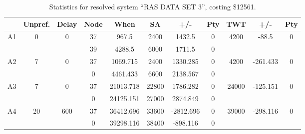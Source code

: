 \begin{sidewaystable}
\footnotesize
\caption{Statistics for resolved system ``RAS DATA SET 3'', costing \$12561.}
\centering
\begin{tabular}{c||c|c||c|c|c|c|c||c|c|c}
  \hline \hline
  &
  Unpref. & 
  Delay &
  Node &
  When &
  SA &
  +/- &
  Pty &
  TWT &
  +/- &
  Pty \\
      \hline
      \multirow{2}{*}{A1} &
      \multirow{2}{*}{0} &
      \multirow{2}{*}{0} &
      37 &
      967.5 &
      2400 &
        1432.5 &
        0 &
      \multirow{2}{*}{4200} &
        \multirow{2}{*}{-88.5} &
        \multirow{2}{*}{0}
      \\
      \cline{4-8}
       &
       &
       &
      39 &
      4288.5 &
      6000 &
        1711.5 &
        0 &
      
         &
        
      \\
      \hline
      \multirow{2}{*}{A2} &
      \multirow{2}{*}{7} &
      \multirow{2}{*}{0} &
      37 &
      1069.715 &
      2400 &
        1330.285 &
        0 &
      \multirow{2}{*}{4200} &
        \multirow{2}{*}{-261.433} &
        \multirow{2}{*}{0}
      \\
      \cline{4-8}
       &
       &
       &
      0 &
      4461.433 &
      6600 &
        2138.567 &
        0 &
      
         &
        
      \\
      \hline
      \multirow{2}{*}{A3} &
      \multirow{2}{*}{7} &
      \multirow{2}{*}{0} &
      37 &
      21013.718 &
      22800 &
        1786.282 &
        0 &
      \multirow{2}{*}{24000} &
        \multirow{2}{*}{-125.151} &
        \multirow{2}{*}{0}
      \\
      \cline{4-8}
       &
       &
       &
      0 &
      24125.151 &
      27000 &
        2874.849 &
        0 &
      
         &
        
      \\
      \hline
      \multirow{2}{*}{A4} &
      \multirow{2}{*}{20} &
      \multirow{2}{*}{600} &
      37 &
      36412.696 &
      33600 &
        -2812.696 &
        0 &
      \multirow{2}{*}{39000} &
        \multirow{2}{*}{-298.116} &
        \multirow{2}{*}{0}
      \\
      \cline{4-8}
       &
       &
       &
      0 &
      39298.116 &
      38400 &
        -898.116 &
        0 &
      

\end{tabular}
\end{sidewaystable}

